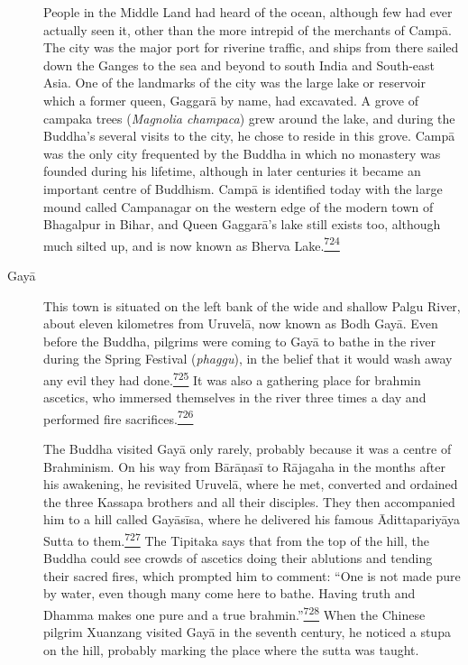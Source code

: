 \begin{description}
People in the Middle Land had heard of the ocean, although few had ever
actually seen it, other than the more intrepid of the merchants of
Campā. The city was the major port for riverine traffic, and ships from
there sailed down the Ganges to the sea and beyond to south India and
South-east Asia. One of the landmarks of the city was the large lake or
reservoir which a former queen, Gaggarā by name, had excavated. A grove
of campaka trees (\emph{Magnolia champaca}) grew around the lake, and
during the Buddha's several visits to the city, he chose to reside in
this grove. Campā was the only city frequented by the Buddha in which no
monastery was founded during his lifetime, although in later centuries
it became an important centre of Buddhism. Campā is identified today
with the large mound called Campanagar on the western edge of the modern
town of Bhagalpur in Bihar, and Queen Gaggarā's lake still exists too,
although much silted up, and is now known as Bherva
Lake.\label{footprints_split_019.html_fnref724}\hyperref[footprints_split_025.htmlux5cux23fn724]{\textsuperscript{724}}
\item[Gayā]
This town is situated on the left bank of the wide and shallow Palgu
River, about eleven kilometres from Uruvelā, now known as Bodh Gayā.
Even before the Buddha, pilgrims were coming to Gayā to bathe in the
river during the Spring Festival (\emph{phaggu}), in the belief that it
would wash away any evil they had
done.\label{footprints_split_019.html_fnref725}\hyperref[footprints_split_025.htmlux5cux23fn725]{\textsuperscript{725}}
It was also a gathering place for brahmin ascetics, who immersed
themselves in the river three times a day and performed fire
sacrifices.\label{footprints_split_019.html_fnref726}\hyperref[footprints_split_025.htmlux5cux23fn726]{\textsuperscript{726}}

The Buddha visited Gayā only rarely, probably because it was a centre of
Brahminism. On his way from Bārāṇasī to Rājagaha in the months after his
awakening, he revisited Uruvelā, where he met, converted and ordained
the three Kassapa brothers and all their disciples. They then
accompanied him to a hill called Gayāsīsa, where he delivered his famous
Ādittapariyāya Sutta to
them.\label{footprints_split_019.html_fnref727}\hyperref[footprints_split_025.htmlux5cux23fn727]{\textsuperscript{727}}
The Tipitaka says that from the top of the hill, the Buddha could see
crowds of ascetics doing their ablutions and tending their sacred fires,
which prompted him to comment: ``One is not made pure by water, even
though many come here to bathe. Having truth and Dhamma makes one pure
and a true
brahmin.''\label{footprints_split_019.html_fnref728}\hyperref[footprints_split_025.htmlux5cux23fn728]{\textsuperscript{728}}
When the Chinese pilgrim Xuanzang visited Gayā in the seventh century,
he noticed a stupa on the hill, probably marking the place where the
sutta was taught.


\end{description}
